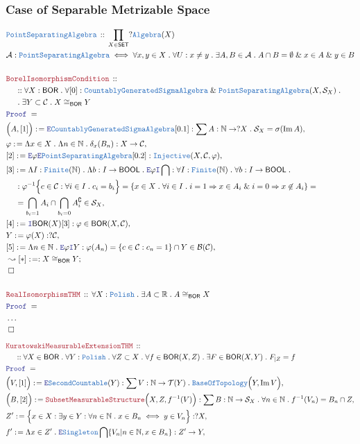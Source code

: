 \documentclass[12pt]{scrartcl}
\newcommand{\TYPE}[1]{\textcolor{NavyBlue}{\mathtt{#1}}}
\newcommand{\LOGIC}[1]{\textcolor{Blue}{\mathtt{#1}}}
\newcommand{\THM}[1]{\textcolor{Maroon}{\mathtt{#1}}}
\renewcommand{\.}{\; . \;}
\newcommand{\de}{: \kern 0.1pc =}
\newcommand{\Theorem}[2]{& \THM{#1} \, :: \, #2 \\ & \Proof = \\ }
\newcommand{\DeclareType}[2]{& \TYPE{#1} \, :: \, #2 \\}
\newcommand{\DefineType}[3]{& #1 : \TYPE{#2} \iff #3 \\}
\newcommand{\NewLine}{\\ & \kern 1pc}
\newcommand{\Page}[1]{ \begin{align*} #1 \end{align*}   }
\newcommand{\NoProof}{ & \ldots \\ \EndProof}
\renewcommand{\And}{\; \& \;}
\newcommand{\Imply}{\Rightarrow}
\newcommand{\Intro}{\LOGIC{I}}
\newcommand{\Elim}{\LOGIC{E}}
\newcommand{\Reals}{\mathbb{R} }
\newcommand{\Nat}{\mathbb{N} }
\DeclareMathOperator*{\im}{Im}
\renewcommand{\c}{\complement}
\newcommand{\Say}[3]{& #1 \de #2 : #3, \\}
\newcommand{\DeriveConclude}[3]{& \leadsto #1 \de #2 : #3 ; \\}
\newcommand{\QED}{\; \square}
\newcommand{\EndProof}{& \QED \\}
\newcommand{\Proof}{\LOGIC{Proof} \; }
\newcommand{\Inj}{\TYPE{Injective}}
\newcommand{\C}{\mathcal{C}}
\newcommand{\A}{\mathcal{A}}
\newcommand{\B}{\mathcal{B}}
\newcommand{\SET}{\mathsf{SET}}
\newcommand{\T}{\mathcal{T}}
\newcommand{\Alg}{\TYPE{Algebra}}
\newcommand{\BOOL}{\mathsf{BOOL}}
\newcommand{\Polish}{\TYPE{Polish}}
\newcommand{\CGSA}{\TYPE{CountablyGeneratedSigmaAlgebra}}
\newcommand{\PSA}{\TYPE{PointSeparatingAlgebra}}
\newcommand{\BOR}{\mathsf{BOR}}
\renewcommand{\S}{\mathcal{S}}
\begin{document}
\subsubsection{Case of Separable Metrizable Space}
\Page{
	\DeclareType{\PSA}
	{
		\prod_{X \in \SET}   ?\Alg(X)
	}
	\DefineType{\A}{\PSA}{
		\forall x, y \in X \. 
		\forall U : x \neq y \.
		\exists A,B \in \A \.
		A \cap B = \emptyset \And x \in A \And y \in B
	}
	\\	
	\Theorem{BorelIsomorphismCondition}
	{
		\NewLine ::		
		\forall X : \BOR \.
		\forall [0] : \CGSA \And \PSA(X,\S_X) \. \NewLine \.
		\exists Y \subset \C \.
		X \cong_\BOR Y
	}
	\Say{\Big(A,[1]\Big)}{\Elim \CGSA [0.1]}
	{
		\sum A : \Nat \to ?X \. \S_X = \sigma(\im A)
	}
	\Say{\varphi}{\Lambda x \in X \. \Lambda n \in \Nat \. \delta_x(B_n) }
	{
		X \to \C
	}
	\Say{[2]}{\Elim \varphi \Elim \PSA [0.2]}{\Inj(X,\C,\varphi)}
	\Say{[3]}{
		\Lambda I : \TYPE{Finite}(\Nat) \.
		\Lambda b : I \to \BOOL \.
		\Elim \varphi
		\Intro \bigcap 	
	}
	{
		\forall I : \TYPE{Finite}(\Nat) \.
		\forall b : I \to \BOOL \.		
		\NewLine :		
		\varphi^{-1}\Big\{ c \in \C : \forall i \in I \.  c_i = b_i \Big\} = 
		\{
			x \in X \.  
			\forall i \in I \. 
			i = 1 \Imply x \in A_i \And
			i = 0 \Imply x \not \in A_i 
		\} = \NewLine =
		\bigcap_{b_i = 1 } A_i
		\cap 
		\bigcap_{b_i = 0 } A_i^\c
		\in 
		\S_X
	}
	\Say{[4]}{\Intro \BOR(X)[3]}{\varphi \in \BOR(X,\C)}
	\Say{Y}{\varphi(X)}{?\C}
	\Say{[5]}{
		\Lambda n \in \Nat \. \Elim \varphi \Intro Y
	}
	{
		 \varphi(A_n) =	
		 \{
			c \in \C :
			c_n = 1		 
		 \}
		\cap Y \in \B(\C)
	}
	\DeriveConclude{[*]}{}{
		X \cong_\BOR Y	
	}
	\EndProof
	\\
	\Theorem{RealIsomorphismTHM}
	{
		\forall X  : \Polish \.
		\exists A \subset \Reals \.
		A \cong_\BOR X
	}
	\NoProof
}\Page{
	\Theorem{KuratowskiMeasurableExtensionTHM}
	{
		\NewLine ::		
		\forall X  \in \BOR \.
		\forall Y : \Polish \. 
		\forall Z \subset X \.
		\forall f \in \BOR(X,Z) \.
		\exists F \in \BOR(X,Y) \.
		F_{|Z} = f
	}
	\Say{\Big(V,[1]\Big)}
	{
		\Elim \TYPE{SecondCountable}(Y)
	}
	{
		\sum V : \Nat \to \T(Y) \.
		\TYPE{BaseOfTopology}\Big(Y, \im V\Big)
	}
	\Say{\Big(B,[2]\Big)}{ \THM{SubsetMeasurableStructure} \Big(X,Z, f^{-1}(V)\Big)}
	{
			\sum B : \Nat \to \S_X \.
			\forall n \in \Nat \.  
			f^{-1}(V_n) = B_n \cap Z
	}
	\Say{Z'}{
		\Big\{
			x \in X : \exists y \in Y : 
			\forall n \in \Nat \. 
			x \in B_n
			\iff
			y \in V_n
		\Big\}	
	}
	{
		?X
	}
	\Say{f'}{\Lambda x \in Z' \. \Elim \TYPE{Singleton} \bigcap \{ V_n   | n \in \Nat, x \in B_n    \}}
	{
		Z' \to Y
}}
\end{document}
